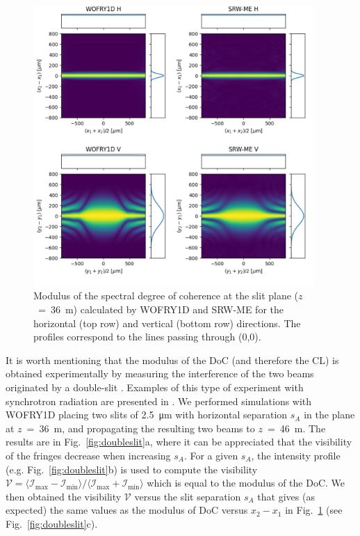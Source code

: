 \documentclass{iucr}              %
\begin{document}
\begin{figure}
    \label{fig:plot_DoC_at_36m}
    \includegraphics[width=0.95\textwidth]{figures/plot_DoC_at_36m.pdf}
    \caption{Modulus of the spectral degree of coherence at the slit plane ($z$~=~\SI{36}{\meter}) calculated by WOFRY1D and SRW-ME for the horizontal (top row) and vertical (bottom row) directions.
    The profiles correspond to the lines passing through (0,0).
    }
\end{figure}

It is worth mentioning that the modulus of the DoC (and therefore the CL) is obtained experimentally by measuring the interference of the two beams originated by a double-slit \cite{ThompsonWolf1957}. Examples of this type of experiment with synchrotron radiation are presented in \cite{Chang2000, Paterson2001, Leitenberger2003, Tran2005}. We performed simulations with WOFRY1D placing two slits of \SI{2.5}{\micro\meter} with horizontal separation $s_A$ in the plane at $z$~=~\SI{36}{\meter}, and propagating the resulting two beams to $z$~=~\SI{46}{\meter}. The results are in Fig.~\ref{fig:doubleslit}a, where it can be appreciated that the visibility of the fringes decrease when increasing $s_A$. For a given $s_A$, the intensity profile (e.g. Fig.~\ref{fig:doubleslit}b) is used to compute the visibility $\mathcal{V}=\langle \mathcal{I}_{\text{max}}-\mathcal{I}_{\text{min}} \rangle\big/\langle \mathcal{I}_{\text{max}}+\mathcal{I}_{\text{min}}\rangle$ which is equal to the modulus of the DoC. We then obtained the visibility $\mathcal{V}$ versus the slit separation $s_A$ that gives (as expected) the same values as the modulus of DoC versus $x_2-x_1$ in Fig.~\ref{fig:plot_DoC_at_36m} (see Fig.~\ref{fig:doubleslit}c). 
\end{document}
